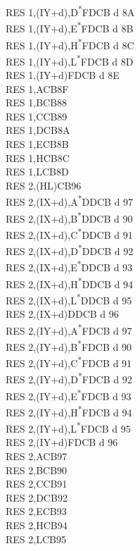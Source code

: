 \documentclass[oneside,a4paper]{book}
\begin{document}
\begin{multicols}{3}
{\begin{tabbing}
RES 1,(IY+d),D\textsuperscript{*}\>FDCB d 8A\\
RES 1,(IY+d),E\textsuperscript{*}\>FDCB d 8B\\
RES 1,(IY+d),H\textsuperscript{*}\>FDCB d 8C\\
RES 1,(IY+d),L\textsuperscript{*}\>FDCB d 8D\\
RES 1,(IY+d)\>FDCB d 8E\\
RES 1,A\>CB8F\\
RES 1,B\>CB88\\
RES 1,C\>CB89\\
RES 1,D\>CB8A\\
RES 1,E\>CB8B\\
RES 1,H\>CB8C\\
RES 1,L\>CB8D\\
RES 2,(HL)\>CB96\\
RES 2,(IX+d),A\textsuperscript{*}\>DDCB d 97\\
RES 2,(IX+d),B\textsuperscript{*}\>DDCB d 90\\
RES 2,(IX+d),C\textsuperscript{*}\>DDCB d 91\\
RES 2,(IX+d),D\textsuperscript{*}\>DDCB d 92\\
RES 2,(IX+d),E\textsuperscript{*}\>DDCB d 93\\
RES 2,(IX+d),H\textsuperscript{*}\>DDCB d 94\\
RES 2,(IX+d),L\textsuperscript{*}\>DDCB d 95\\
RES 2,(IX+d)\>DDCB d 96\\
RES 2,(IY+d),A\textsuperscript{*}\>FDCB d 97\\
RES 2,(IY+d),B\textsuperscript{*}\>FDCB d 90\\
RES 2,(IY+d),C\textsuperscript{*}\>FDCB d 91\\
RES 2,(IY+d),D\textsuperscript{*}\>FDCB d 92\\
RES 2,(IY+d),E\textsuperscript{*}\>FDCB d 93\\
RES 2,(IY+d),H\textsuperscript{*}\>FDCB d 94\\
RES 2,(IY+d),L\textsuperscript{*}\>FDCB d 95\\
RES 2,(IY+d)\>FDCB d 96\\
RES 2,A\>CB97\\
RES 2,B\>CB90\\
RES 2,C\>CB91\\
RES 2,D\>CB92\\
RES 2,E\>CB93\\
RES 2,H\>CB94\\
RES 2,L\>CB95\\

\end{tabbing}}
\end{multicols}
\end{document}
